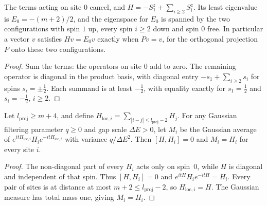 \begin{lemma}
    \label{thm:hastings_low_energy_example_hamiltonian}
    \leanok
    The terms acting on site $0$ cancel, and
    $H=-S^z_1+\sum_{i\ge2}S^z_i$. Its least eigenvalue is
    $E_0=-(m+2)/2$, and the eigenspace for $E_0$ is spanned by the two
    configurations with spin $1$ up, every spin $i\ge2$ down and spin $0$
    free. In particular a vector $v$ satisfies $Hv=E_0v$ exactly when
    $Pv=v$, for the orthogonal projection $P$ onto these two
    configurations.
\end{lemma}
\begin{proof}\leanok
    Sum the terms: the operators on site $0$ add to zero. The remaining
    operator is diagonal in the product basis, with diagonal entry
    $-s_1+\sum_{i\ge2}s_i$ for spins $s_i=\pm\tfrac12$. Each summand is at
    least $-\tfrac12$, with equality exactly for $s_1=\tfrac12$ and
    $s_i=-\tfrac12$, $i\ge2$.
\end{proof}

\begin{lemma}
    \label{thm:hastings_low_energy_example_truncated}
    \leanok
    Let $l_{\mathrm{proj}}\ge m+4$, and define
    $H_{\mathrm{loc},i}=\sum_{|i-j|\le l_{\mathrm{proj}}-2}H_j$.
    For any Gaussian filtering parameter $q\ge0$ and gap scale $\Delta E>0$,
    let $M_i$ be the Gaussian average of
    $e^{itH_{\mathrm{loc},i}}H_ie^{-itH_{\mathrm{loc},i}}$ with variance
    $q/\Delta E^2$. Then $[H,H_i]=0$ and $M_i=H_i$ for every site $i$.
\end{lemma}
\begin{proof}\leanok
    The non-diagonal part of every $H_i$ acts only on spin~$0$, while $H$
    is diagonal and independent of that spin. Thus $[H,H_i]=0$ and
    $e^{itH}H_ie^{-itH}=H_i$. Every pair of sites is at distance at most
    $m+2\le l_{\mathrm{proj}}-2$, so $H_{\mathrm{loc},i}=H$.
    The Gaussian measure has total mass one, giving $M_i=H_i$.
\end{proof}

